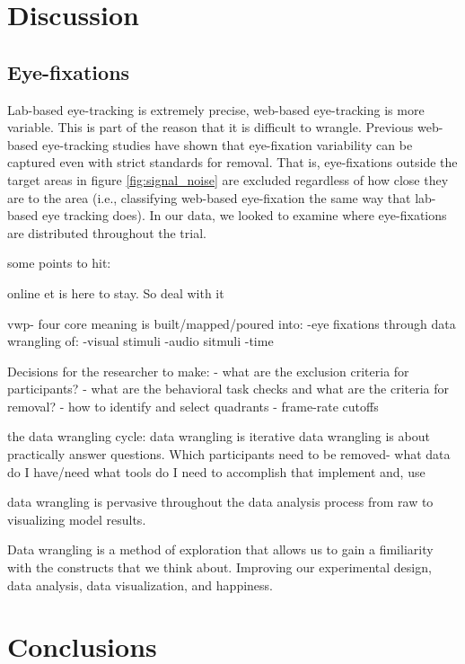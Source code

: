 \section{Discussion}

\subsection{Eye-fixations}
Lab-based eye-tracking is extremely precise, web-based eye-tracking is more variable. This is part of the reason that it is difficult to wrangle. Previous web-based eye-tracking studies have shown that eye-fixation variability can be captured even with strict standards for removal. That is, eye-fixations outside the target areas in figure \ref{fig:signal_noise} are excluded regardless of how close they are to the area (i.e., classifying web-based eye-fixation the same way that lab-based eye tracking does). In our data, we looked to examine where eye-fixations are distributed throughout the trial. 




some points to hit:


online et is here to stay. So deal with it

vwp- four core
meaning is built/mapped/poured into:
-eye fixations
through data wrangling of:
-visual stimuli
-audio sitmuli
-time

Decisions for the researcher to make:
- what are the exclusion criteria for participants?
- what are the behavioral task checks and what are the criteria for removal?
- how to identify and select quadrants
- frame-rate cutoffs



the data wrangling cycle: 
data wrangling is iterative
data wrangling is about practically answer questions. Which participants need to be removed-
what data do I have/need
what tools do I need to accomplish that
implement
and, use

data wrangling is pervasive throughout the data analysis process from raw to visualizing model results.

Data wrangling is a method of exploration that allows us to gain a fimiliarity with the constructs that we think about. Improving our experimental design, data analysis, data visualization, and happiness.

\section{Conclusions}